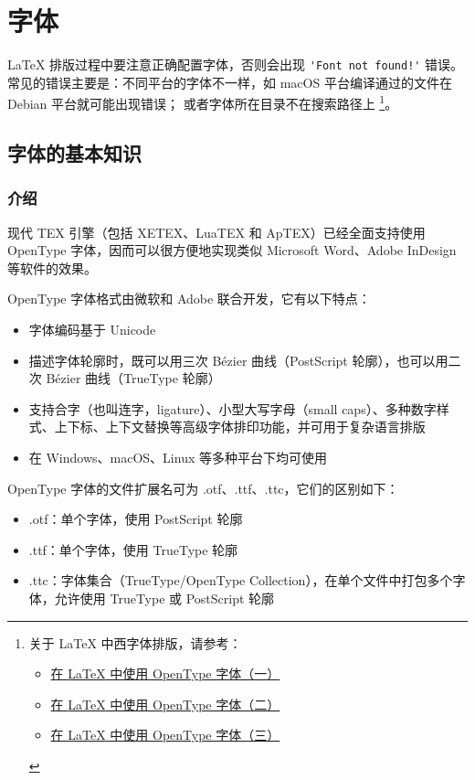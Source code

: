 \chapter{字体}

{\LaTeX} 排版过程中要注意正确配置字体，否则会出现 \verb|'Font not found!'| 错误。
常见的错误主要是：不同平台的字体不一样，如 macOS 平台编译通过的文件在 Debian 平台就可能出现错误；
或者字体所在目录不在搜索路径上
\footnote{
关于 {\LaTeX} 中西字体排版，请参考：
\begin{itemize}
  \item \href{https://stone-zeng.github.io/2018-08-08-use-opentype-fonts}{在 {\LaTeX} 中使用 OpenType 字体（一）}
  \item \href{https://stone-zeng.github.io/2019-07-06-use-opentype-fonts-ii}{在 {\LaTeX} 中使用 OpenType 字体（二）}
  \item \href{https://stone-zeng.github.io/2020-05-02-use-opentype-fonts-iii/}{在 {\LaTeX} 中使用 OpenType 字体（三）}
\end{itemize}
}。

\section{字体的基本知识}

\subsection{介绍}
现代 TEX 引擎（包括 X⁠E⁠TEX、Lua­TEX 和 Ap­TEX）已经全面支持使用 OpenType 字体，因而可以很方便地实现类似 Microsoft Word、Adobe InDesign 等软件的效果。

OpenType 字体格式由微软和 Adobe 联合开发，它有以下特点：

\begin{itemize}
  \item 字体编码基于 Unicode
  \item 描述字体轮廓时，既可以用三次 Bézier 曲线（PostScript 轮廓），也可以用二次 Bézier 曲线（TrueType 轮廓）
  \item 支持合字（也叫连字，ligature）、小型大写字母（small caps）、多种数字样式、上下标、上下文替换等高级字体排印功能，并可用于复杂语言排版
  \item 在 Windows、macOS、Linux 等多种平台下均可使用
\end{itemize}

OpenType 字体的文件扩展名可为 .otf、.ttf、.ttc，它们的区别如下：

\begin{itemize}
  \item .otf：单个字体，使用 PostScript 轮廓
  \item .ttf：单个字体，使用 TrueType 轮廓
  \item .ttc：字体集合（TrueType/OpenType Collection），在单个文件中打包多个字体，允许使用 TrueType 或 PostScript 轮廓
\end{itemize}


